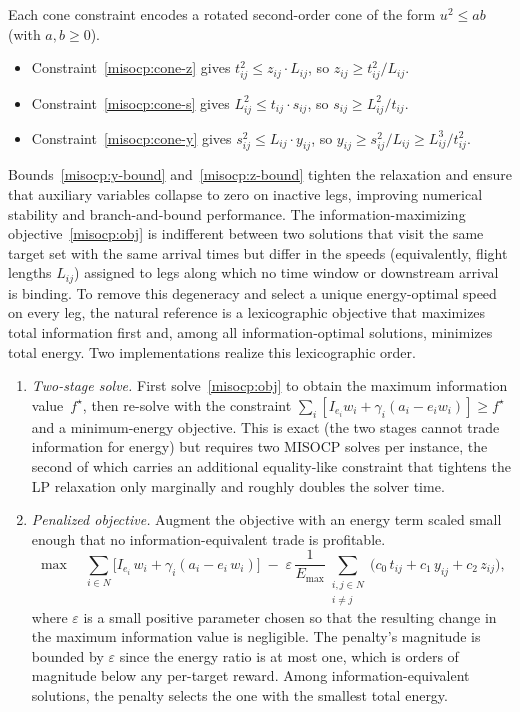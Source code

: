 \documentclass[11pt]{article}
\begin{document}
Each cone constraint encodes a rotated second-order cone of the form $u^2 \le ab$ (with $a, b \ge 0$).
\begin{itemize}
    \item Constraint~\eqref{misocp:cone-z} gives $t_{ij}^2 \le z_{ij} \cdot L_{ij}$, so $z_{ij} \ge t_{ij}^2 / L_{ij}$.
    \item Constraint~\eqref{misocp:cone-s} gives $L_{ij}^2 \le t_{ij} \cdot s_{ij}$, so $s_{ij} \ge L_{ij}^2 / t_{ij}$.
    \item Constraint~\eqref{misocp:cone-y} gives $s_{ij}^2 \le L_{ij} \cdot y_{ij}$, so $y_{ij} \ge s_{ij}^2 / L_{ij} \ge L_{ij}^3 / t_{ij}^2$.
\end{itemize}
Bounds~\eqref{misocp:y-bound} and~\eqref{misocp:z-bound} tighten the relaxation and ensure that auxiliary variables collapse to zero on inactive legs, improving numerical stability and branch-and-bound performance. 
The information-maximizing objective~\eqref{misocp:obj} is indifferent between two solutions that visit the same target set with the same arrival times but differ in the speeds (equivalently, flight lengths $L_{ij}$) assigned to legs along which no time window or downstream arrival is binding. To remove this degeneracy and select a unique energy-optimal speed on every leg, the natural reference is a lexicographic objective that maximizes total information first and, among all information-optimal solutions, minimizes total energy. Two implementations realize this lexicographic order.
\begin{enumerate}
    \item[(i)] \emph{Two-stage solve.} First solve~\eqref{misocp:obj} to obtain the maximum information value~$f^\star$, then re-solve with the constraint $\sum_i [I_{e_i} w_i + \gamma_i (a_i - e_i w_i)] \ge f^\star$ and a minimum-energy objective. This is exact (the two stages cannot trade information for energy) but requires two MISOCP solves per instance, the second of which carries an additional equality-like constraint that tightens the LP relaxation only marginally and roughly doubles the solver time.
    \item[(ii)] \emph{Penalized objective.} Augment the objective with an energy term scaled small enough that no information-equivalent trade is profitable.
    \begin{equation}\label{eq:tiebreaker}
    \max \quad \sum_{i \in N} \bigl[ I_{e_i}\, w_i + \gamma_i (a_i - e_i\, w_i) \bigr] \;-\; \varepsilon\, \frac{1}{E_{\max}} \sum_{\substack{i, j \in N \\ i \neq j}} \bigl( c_0\, t_{ij} + c_1\, y_{ij} + c_2\, z_{ij} \bigr),
    \end{equation}
    where $\varepsilon$ is a small positive parameter chosen so that the resulting change in the maximum information value is negligible. The penalty's magnitude is bounded by $\varepsilon$ since the energy ratio is at most one, which is orders of magnitude below any per-target reward. Among information-equivalent solutions, the penalty selects the one with the smallest total energy.
\end{enumerate}
\end{document}
